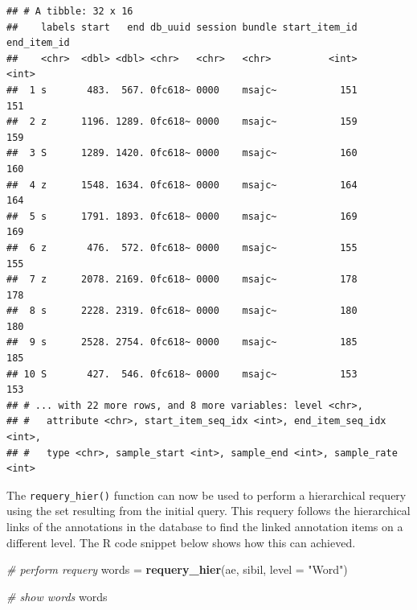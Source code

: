\documentclass[]{book}
\newenvironment{Shaded}{\begin{snugshade}}{\end{snugshade}}
\newcommand{\CommentTok}[1]{\textcolor[rgb]{0.56,0.35,0.01}{\textit{#1}}}
\newcommand{\DataTypeTok}[1]{\textcolor[rgb]{0.13,0.29,0.53}{#1}}
\newcommand{\KeywordTok}[1]{\textcolor[rgb]{0.13,0.29,0.53}{\textbf{#1}}}
\newcommand{\NormalTok}[1]{#1}
\newcommand{\StringTok}[1]{\textcolor[rgb]{0.31,0.60,0.02}{#1}}
\begin{document}
\begin{verbatim}
## # A tibble: 32 x 16
##    labels start   end db_uuid session bundle start_item_id end_item_id
##    <chr>  <dbl> <dbl> <chr>   <chr>   <chr>          <int>       <int>
##  1 s       483.  567. 0fc618~ 0000    msajc~           151         151
##  2 z      1196. 1289. 0fc618~ 0000    msajc~           159         159
##  3 S      1289. 1420. 0fc618~ 0000    msajc~           160         160
##  4 z      1548. 1634. 0fc618~ 0000    msajc~           164         164
##  5 s      1791. 1893. 0fc618~ 0000    msajc~           169         169
##  6 z       476.  572. 0fc618~ 0000    msajc~           155         155
##  7 z      2078. 2169. 0fc618~ 0000    msajc~           178         178
##  8 s      2228. 2319. 0fc618~ 0000    msajc~           180         180
##  9 s      2528. 2754. 0fc618~ 0000    msajc~           185         185
## 10 S       427.  546. 0fc618~ 0000    msajc~           153         153
## # ... with 22 more rows, and 8 more variables: level <chr>,
## #   attribute <chr>, start_item_seq_idx <int>, end_item_seq_idx <int>,
## #   type <chr>, sample_start <int>, sample_end <int>, sample_rate <int>
\end{verbatim}

The \texttt{requery\_hier()} function can now be used to perform a hierarchical requery using the set resulting from the initial query. This requery follows the hierarchical links of the annotations in the database to find the linked annotation items on a different level. The R code snippet below shows how this can achieved.

\begin{Shaded}
\begin{Highlighting}[]
\CommentTok{# perform requery}
\NormalTok{words =}\StringTok{ }\KeywordTok{requery_hier}\NormalTok{(ae, sibil, }\DataTypeTok{level =} \StringTok{"Word"}\NormalTok{)}

\CommentTok{# show words}
\NormalTok{words}
\end{Highlighting}
\end{Shaded}
\end{document}
